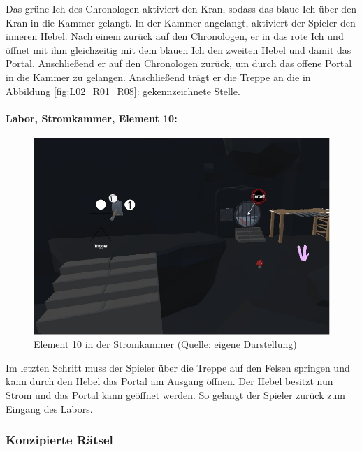Das grüne Ich des Chronologen aktiviert den Kran, sodass das blaue Ich über den Kran in die Kammer gelangt. In der Kammer angelangt, aktiviert der Spieler den inneren Hebel. Nach einem  zurück auf den Chronologen,  er in das rote Ich und öffnet mit ihm gleichzeitig mit dem blauen Ich den zweiten Hebel und damit das Portal. Anschließend  er auf den Chronologen zurück, um durch das offene Portal in die Kammer zu gelangen. Anschließend trägt er die Treppe an die in Abbildung \ref{fig:L02_R01_R08}:  gekennzeichnete Stelle.

\paragraph{Labor, Stromkammer, Element 10:}\label{p:lse10}

\begin{figure}[ht]
\centering
\includegraphics[width=1\linewidth]{content/pictures/Raetsel-L02_R01_R09.jpg}
\caption{Element 10 in der Stromkammer (Quelle: eigene Darstellung)}
\label{fig:L02_R01_R09}
\end{figure}

Im letzten Schritt muss der Spieler über die Treppe auf den Felsen springen und kann durch den Hebel das Portal am Ausgang öffnen. Der Hebel besitzt nun Strom und das Portal kann geöffnet werden. So gelangt der Spieler zurück zum Eingang des Labors.

\subsubsection{Konzipierte Rätsel}

